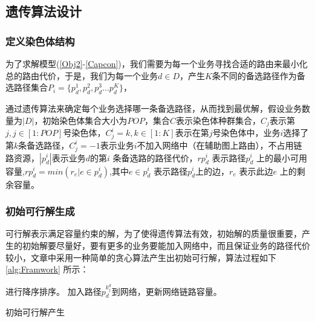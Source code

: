 \subsection{遗传算法设计}
\subsubsection{定义染色体结构}

为了求解模型(\ref{Obj2}-\ref{Capcon})，我们需要为每一个业务寻找合适的路由来最小化总的路由代价，于是，我们为每一个业务$d \in D$，产生$K$条不同的备选路径作为备选路径集合$P_i=\{p^1_d,p^2_d,p^3_d...p^K_d\}$，

通过遗传算法来确定每个业务选择哪一条备选路径，从而找到最优解，假设业务数量为$|D|$，初始染色体集合大小为$POP$，集合$C$表示染色体种群集合，$C_j$表示第$j,j \in [1:POP]$号染色体，$C^i_j=k,k \in [1:K]$表示在第$j$号染色体中，业务$i$选择了第$k$条备选路径，$C^i_j=-1$表示业务$i$不加入网络中（在辅助图上路由），不占用链路资源，$|p^i_d|$表示业务$d$的第$i$ 条备选路的路径代价，$rp^i_d$ 表示路径$p^i_d$ 上的最小可用容量,$rp^i_d=min(r_e|e \in p^i_d)$,其中$e \in p^i_d$ 表示路径$p^i_d$上的边，$r_e$ 表示此边$e$ 上的剩余容量。
\subsubsection{初始可行解生成}
可行解表示满足容量约束的解，为了使得遗传算法有效，初始解的质量很重要，产生的初始解要尽量好，要有更多的业务要能加入网络中，而且保证业务的路径代价较小，文章中采用一种简单的贪心算法产生出初始可行解，算法过程如下 \ref{alg:Framwork} 所示：
\begin{algorithm}[htb]
\begin{algorithmic}[1]
\EndFor
\EndFor
{}
\EndFor
{}进行降序排序。
\State 加入路径$p^{k^d_j}_d$到网络，更新网络链路容量。
\Else
{}
\EndIf
\EndFor
\EndFor
\end{algorithmic}
\caption{初始可行解产生}
\label{alg:Framwork}
\end{algorithm}


